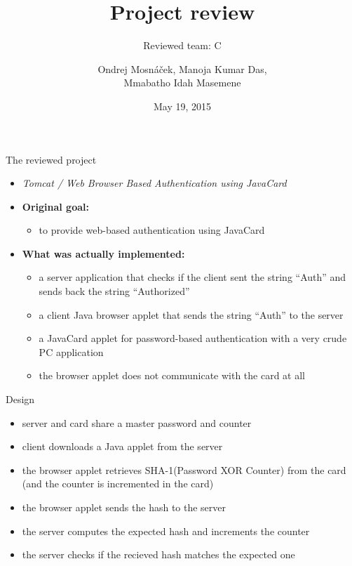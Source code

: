 \documentclass[12pt, t]{beamer}
\author{Ondrej Mosnáček, Manoja Kumar Das, \\Mmabatho Idah Masemene}
\title{Project review}
\subtitle{Reviewed team: C}
\institute{PV204 - Security Technologies}
\date{May 19, 2015}
\begin{document}
\begin{frame}
  \titlepage
\end{frame}

\begin{frame}{The reviewed project}
  \begin{itemize}
    \item \emph{Tomcat / Web Browser Based Authentication using JavaCard}
    \item \textbf{Original goal:}
      \begin{itemize}
        \item to provide web-based authentication using JavaCard
      \end{itemize}
    \item \textbf{What was actually implemented:}
      \begin{itemize}
        \item a server application that checks if the client sent the string ``Auth'' and sends back the string ``Authorized''
        \item a client Java browser applet that sends the string ``Auth'' to the server
        \item a JavaCard applet for password-based authentication with a very crude PC application
        \item the browser applet does not communicate with the card at all
      \end{itemize}
  \end{itemize}
\end{frame}

\begin{frame}{Design}
  \begin{itemize}
    \item server and card share a master password and counter
    \item client downloads a Java applet from the server
    \item the browser applet retrieves SHA-1(Password XOR Counter) from the card (and the counter is incremented in the card)
    \item the browser applet sends the hash to the server
    \item the server computes the expected hash and increments the counter
    \item the server checks if the recieved hash matches the expected one
  \end{itemize}
\end{frame}
\end{document}
